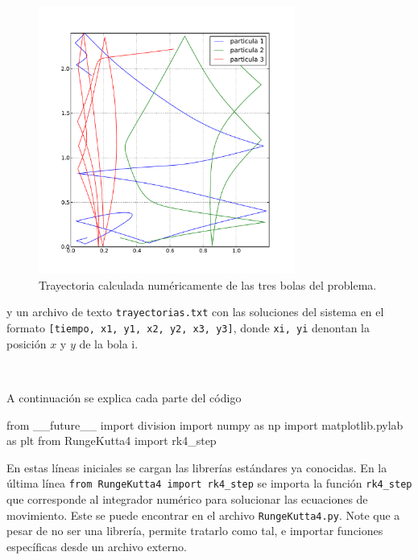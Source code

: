 \begin{figure}[htbp]
	\centering
	\includegraphics[width=0.75\textwidth]
	{./pictures/demo2_03(1).pdf}

	\caption{\small{Trayectoria calculada numéricamente de las tres bolas
	del problema.}}
	
	\label{fig:balls_trayectories}
\end{figure}


y un archivo de texto \texttt{trayectorias.txt} con las soluciones del 
sistema en el formato \texttt{[tiempo, x1, y1, x2, y2, x3, y3]}, donde 
\texttt{xi, yi} denontan la posición $x$ y $y$ de la bola i. 

\

A continuación se explica cada parte del código


\begin{listing}[style=python, numbers = none]
from __future__ import division
import numpy as np
import matplotlib.pylab as plt
from RungeKutta4 import rk4_step
\end{listing}
En estas líneas iniciales se cargan las librerías estándares ya conocidas.
En la última línea \texttt{from RungeKutta4 import rk4\_step} se importa
la función \texttt{rk4\_step} que corresponde al integrador numérico para 
solucionar las ecuaciones de movimiento. Este se puede encontrar en el 
archivo \texttt{RungeKutta4.py}. Note que a pesar de no ser una librería, 
\python permite tratarlo como tal, e importar funciones específicas desde
un archivo externo.


